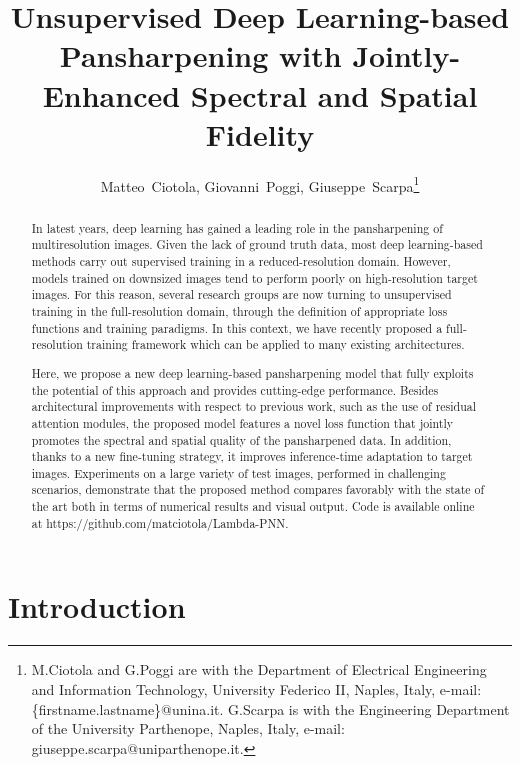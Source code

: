 \documentclass[journal]{IEEEtran}
\begin{document}
\title{Unsupervised Deep Learning-based Pansharpening with Jointly-Enhanced Spectral and Spatial Fidelity}

\author{
Matteo~Ciotola, Giovanni~Poggi, Giuseppe~Scarpa\thanks{
M.Ciotola and G.Poggi are with the Department of Electrical Engineering and Information Technology, University Federico II, Naples, Italy, e-mail: \{firstname.lastname\}@unina.it.
G.Scarpa is with the Engineering Department of the University Parthenope, Naples, Italy, e-mail: giuseppe.scarpa@uniparthenope.it.}}
\maketitle

\begin{abstract}
In latest years, deep learning has gained a leading role in the pansharpening of multiresolution images.
Given the lack of ground truth data, most deep learning-based methods carry out supervised training in a reduced-resolution domain.
However, models trained on downsized images tend to perform poorly on high-resolution target images.
For this reason, several research groups are now turning to unsupervised training in the full-resolution domain,
through the definition of appropriate loss functions and training paradigms.
In this context, we have recently proposed a full-resolution training framework which can be applied to many existing architectures.

Here, we propose a new deep learning-based pansharpening model that fully exploits the potential of this approach and provides cutting-edge performance.
Besides architectural improvements with respect to previous work, such as the use of residual attention modules,
the proposed model features a novel loss function that jointly promotes the spectral and spatial quality of the pansharpened data.
In addition, thanks to a new fine-tuning strategy, it improves inference-time adaptation to target images.
Experiments on a large variety of test images, performed in challenging scenarios,
demonstrate that the proposed method compares favorably with the state of the art both in terms of numerical results and visual output.
Code is available online at https://github.com/matciotola/Lambda-PNN.
\end{abstract}



\IEEEpeerreviewmaketitle

\section{Introduction}
\end{document}
